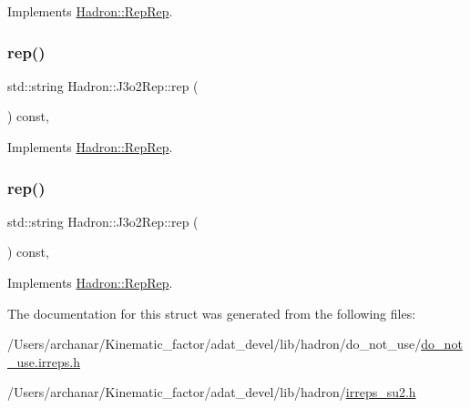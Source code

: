 Implements \mbox{\hyperlink{structHadron_1_1RepRep_ab3213025f6de249f7095892109575fde}{Hadron\+::\+Rep\+Rep}}.

\mbox{\label{structHadron_1_1J3o2Rep_a4284616b9bdc9582f085ab1b60a15f1d}} 
\subsubsection{\texorpdfstring{rep()}{rep()}\hspace{0.1cm}{\footnotesize\ttfamily [2/3]}}
{\footnotesize\ttfamily std\+::string Hadron\+::\+J3o2\+Rep\+::rep (\begin{DoxyParamCaption}{ }\end{DoxyParamCaption}) const\hspace{0.3cm}{\ttfamily [inline]}, {\ttfamily [virtual]}}



Implements \mbox{\hyperlink{structHadron_1_1RepRep_ab3213025f6de249f7095892109575fde}{Hadron\+::\+Rep\+Rep}}.

\mbox{\label{structHadron_1_1J3o2Rep_a4284616b9bdc9582f085ab1b60a15f1d}} 
\subsubsection{\texorpdfstring{rep()}{rep()}\hspace{0.1cm}{\footnotesize\ttfamily [3/3]}}
{\footnotesize\ttfamily std\+::string Hadron\+::\+J3o2\+Rep\+::rep (\begin{DoxyParamCaption}{ }\end{DoxyParamCaption}) const\hspace{0.3cm}{\ttfamily [inline]}, {\ttfamily [virtual]}}



Implements \mbox{\hyperlink{structHadron_1_1RepRep_ab3213025f6de249f7095892109575fde}{Hadron\+::\+Rep\+Rep}}.



The documentation for this struct was generated from the following files\+:\begin{DoxyCompactItemize}
\item 
/\+Users/archanar/\+Kinematic\+\_\+factor/adat\+\_\+devel/lib/hadron/do\+\_\+not\+\_\+use/\mbox{\hyperlink{do__not__use_8irreps_8h}{do\+\_\+not\+\_\+use.\+irreps.\+h}}\item 
/\+Users/archanar/\+Kinematic\+\_\+factor/adat\+\_\+devel/lib/hadron/\mbox{\hyperlink{lib_2hadron_2irreps__su2_8h}{irreps\+\_\+su2.\+h}}\end{DoxyCompactItemize}
